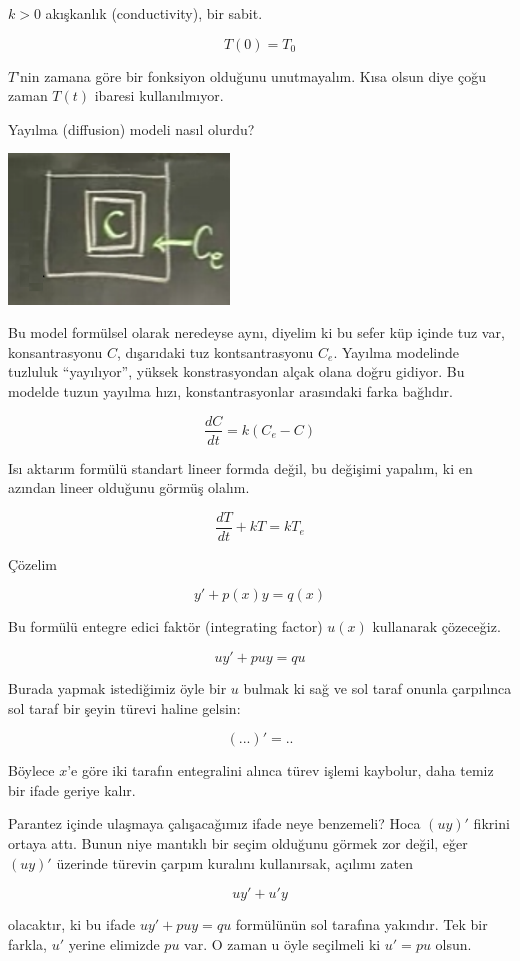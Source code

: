 \documentclass[12pt,fleqn]{article}\usepackage{../../common}
\begin{document}
$k > 0$ akışkanlık (conductivity), bir sabit.

$$ T(0) = T_0 $$

$T$'nin zamana göre bir fonksiyon olduğunu unutmayalım. Kısa olsun diye
çoğu zaman $T(t)$ ibaresi kullanılmıyor.

Yayılma (diffusion) modeli nasıl olurdu? 

\includegraphics[height=4cm]{3_2.png}

Bu model formülsel olarak neredeyse aynı, diyelim ki bu sefer küp içinde
tuz var, konsantrasyonu $C$, dışarıdaki tuz kontsantrasyonu $C_e$. Yayılma
modelinde tuzluluk ``yayılıyor'', yüksek konstrasyondan alçak olana doğru
gidiyor. Bu modelde tuzun yayılma hızı, konstantrasyonlar arasındaki farka
bağlıdır.

$$ \frac{dC}{dt} = k(C_e - C) $$

Isı aktarım formülü standart lineer formda değil, bu değişimi yapalım, ki
en azından lineer olduğunu görmüş olalım.

$$ \frac{dT}{dt} + kT = kT_e $$

Çözelim

$$ y' + p(x)y = q(x) $$

Bu formülü entegre edici faktör (integrating factor) $u(x)$ kullanarak
çözeceğiz.

$$ uy' + puy = qu $$

Burada yapmak istediğimiz öyle bir $u$ bulmak ki sağ ve sol taraf
onunla çarpılınca sol taraf bir şeyin türevi haline gelsin:

$$ ( ... )' = ..  $$

Böylece $x$'e göre iki tarafın entegralini alınca türev işlemi
kaybolur, daha temiz bir ifade geriye kalır. 

Parantez içinde ulaşmaya çalışacağımız ifade neye benzemeli? Hoca
$(uy)'$ fikrini ortaya attı. Bunun niye mantıklı bir seçim olduğunu
görmek zor değil, eğer $(uy)'$ üzerinde türevin çarpım kuralını
kullanırsak, açılımı zaten 

$$ uy' + u'y $$

olacaktır, ki bu ifade $uy' + puy = qu$ formülünün sol tarafına
yakındır. Tek bir farkla, $u'$ yerine elimizde $pu$ var. O zaman u
öyle seçilmeli ki $u' = pu$ olsun. 
\end{document}
